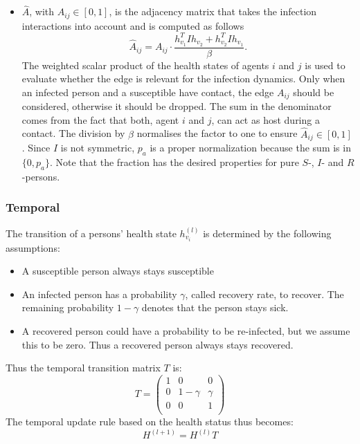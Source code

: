 \begin{itemize}
\begin{itemize}
        \item $\hat{A}$, with $\hat{A}_{ij}\in [0, 1]$, is the adjacency matrix that takes the infection interactions into account and is computed as follows
        \begin{equation}
            \hat{A}_{ij} = A_{ij}\cdot \frac{ h_{v_1}^T I h_{v_2} + h_{v_2}^T I h_{v_1} }{\beta}.
        \end{equation}
        The weighted scalar product of the health states of agents $i$ and $j$ is used to evaluate whether the edge is relevant for the infection dynamics. Only when an infected person and a susceptible have contact, the edge $A_{ij}$ should be considered, otherwise it should be dropped.	The sum in the denominator comes from the fact that both, agent $i$ and $j$, can act as host during a contact. The division by $\beta$ normalises the factor to one to ensure $\hat{A}_{ij} \in [0, 1]$. Since $I$ is not symmetric, $p_a$ is a proper normalization because the sum is in $\{0, p_a\}$. Note that the fraction has the desired properties for pure $S$-, $I$- and $R$-persons.
    \end{itemize}
\end{itemize}


\subsubsection{Temporal}
The transition of a persons' health state $h_{v_i}^{(l)}$ is determined by the following assumptions:
\begin{itemize}
	\item A susceptible person always stays susceptible
	\item An infected person has a probability $\gamma$, called recovery rate, to recover. The remaining probability $1-\gamma$ denotes that the person stays sick.
	\item A recovered person could have a probability to be re-infected, but we assume this to be zero. Thus a recovered person always stays recovered.
\end{itemize}
Thus the temporal transition matrix $T$ is:
\begin{equation}
	T = 
	\begin{pmatrix}
		1 &     0    & 0      \\
		0 & 1-\gamma & \gamma \\
		0 &     0    & 1      \\
	\end{pmatrix}
\end{equation}
The temporal update rule based on the health status thus becomes:
\begin{equation}
	H^{(l+1)} = H^{(l)} T
\end{equation}

